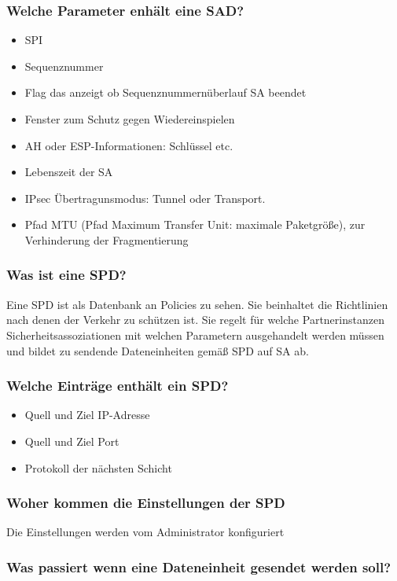 	\subsubsection{Welche Parameter enhält eine SAD?}
	\begin{itemize}
		\item SPI
		\item Sequenznummer
		\item Flag das anzeigt ob Sequenznummernüberlauf SA beendet
		\item Fenster zum Schutz gegen Wiedereinspielen
		\item AH oder ESP-Informationen: Schlüssel etc.
		\item Lebenszeit der SA
		\item IPsec Übertragunsmodus: Tunnel oder Transport.
		\item Pfad MTU (Pfad Maximum Transfer Unit: maximale Paketgröße), zur Verhinderung der Fragmentierung
	\end{itemize}
	
	\subsubsection{Was ist eine SPD?}
	Eine SPD ist als Datenbank an Policies zu sehen. Sie beinhaltet die Richtlinien nach denen der Verkehr zu schützen ist.  Sie regelt für welche Partnerinstanzen Sicherheitsassoziationen mit welchen Parametern ausgehandelt werden müssen und bildet zu sendende Dateneinheiten gemäß SPD auf SA ab.
	
	\subsubsection{Welche Einträge enthält ein SPD?}
	\begin{itemize}
		\item Quell und Ziel IP-Adresse
		\item Quell und Ziel Port
		\item Protokoll der nächsten Schicht
	\end{itemize}	
	
	\subsubsection{Woher kommen die Einstellungen der SPD}
	Die Einstellungen werden vom Administrator konfiguriert		
	
	\subsubsection{Was passiert wenn eine Dateneinheit gesendet werden soll?}
		
